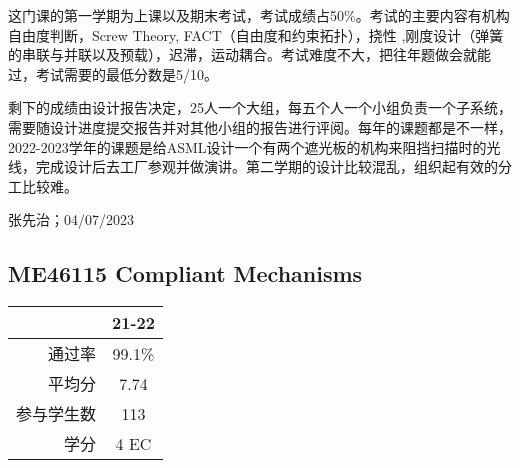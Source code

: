 这门课的第一学期为上课以及期末考试，考试成绩占50\%。考试的主要内容有机构自由度判断，Screw Theory, FACT（自由度和约束拓扑），挠性 ,刚度设计（弹簧的串联与并联以及预载），迟滞，运动耦合。考试难度不大，把往年题做会就能过，考试需要的最低分数是5/10。

剩下的成绩由设计报告决定，25人一个大组，每五个人一个小组负责一个子系统，需要随设计进度提交报告并对其他小组的报告进行评阅。每年的课题都是不一样，2022-2023学年的课题是给ASML设计一个有两个遮光板的机构来阻挡扫描时的光线，完成设计后去工厂参观并做演讲。第二学期的设计比较混乱，组织起有效的分工比较难。
\begin{flushright}
张先治；04/07/2023
\end{flushright}

\subsection{ME46115 Compliant Mechanisms}\hypertarget{ME46115}{} 
\begin{minipage}{0.45\textwidth}
\centering
{}
\end{minipage}%
\begin{minipage}{0.45\textwidth}
\raggedleft
\begin{tabular}{r|c}
\textbf{ } & \textbf{21-22} \\ \hline
通过率 & 99.1\%\\ 
平均分 & 7.74 \\ 
参与学生数 & 113 \\ 
学分 & 4 EC\\
\end{tabular}
\end{minipage}\\

